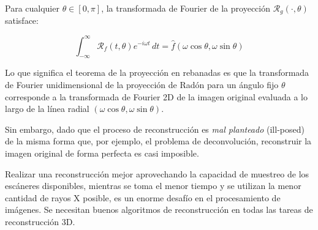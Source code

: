 \begin{teorema}
Para cualquier $\theta \in [0, \pi]$, la transformada de Fourier de la proyección $\mathcal{R}_g(\cdot,\theta)$ satisface:

\[
\int_{-\infty}^{\infty} \mathcal{R}_f(t, \theta) e^{-i \omega t} \, dt = \hat{f}(\omega \cos \theta, \omega \sin \theta) \tag{2.10}
\]
\end{teorema}

Lo que significa el teorema de la proyección en rebanadas es que la transformada de Fourier unidimensional de la proyección de Radón para un ángulo fijo $\theta$ corresponde a la transformada de Fourier 2D de la imagen original evaluada a lo largo de la línea radial $(\omega \cos \theta, \omega \sin \theta)$.

Sin embargo, dado que el proceso de reconstrucción es \textit{mal planteado} (ill-posed) de la misma forma que, por ejemplo, el problema de deconvolución, reconstruir la imagen original de forma perfecta es casi imposible.

Realizar una reconstrucción mejor aprovechando la capacidad de muestreo de los escáneres disponibles, mientras se toma el menor tiempo y se utilizan la menor cantidad de rayos X posible, es un enorme desafío en el procesamiento de imágenes. Se necesitan buenos algoritmos de reconstrucción en todas las tareas de reconstrucción 3D.


\endinput
